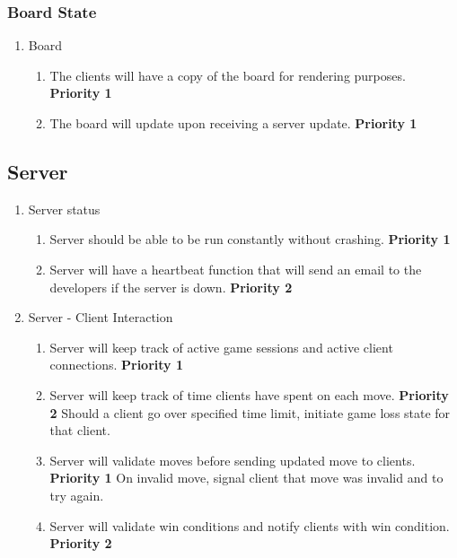 \documentclass[10pt]{article}
\begin{document}
\subsubsection{Board State}

\begin{enumerate}[resume*]
    \item Board
    \begin{enumerate}[label*=\arabic*.]
        \item The clients will have a copy of the board for rendering purposes. \textbf{Priority 1}
        \item The board will update upon receiving a server update. \textbf{Priority 1}
    \end{enumerate}
\end{enumerate}

\subsection{Server}

\begin{enumerate}[resume*]
    \item Server status
    \begin{enumerate}[label*=\arabic*.]
        \item Server should be able to be run constantly without crashing. \textbf{Priority 1}
        \item Server will have a heartbeat function that will send an email to the developers if the server is down. \textbf{Priority 2}
    \end{enumerate}
    \item Server - Client Interaction
    \begin{enumerate}[label*=\arabic*.]
        \item Server will keep track of active game sessions and active client connections. \textbf{Priority 1}
        \item Server will keep track of time clients have spent on each move. \textbf{Priority 2}
            \subitem Should a client go over specified time limit, initiate game loss state for that client.
        \item Server will validate moves before sending updated move to clients. \textbf{Priority 1}
            \subitem On invalid move, signal client that move was invalid and to try again.
        \item Server will validate win conditions and notify clients with win condition. \textbf{Priority 2}
    \end{enumerate}
\end{enumerate}
\end{document}

